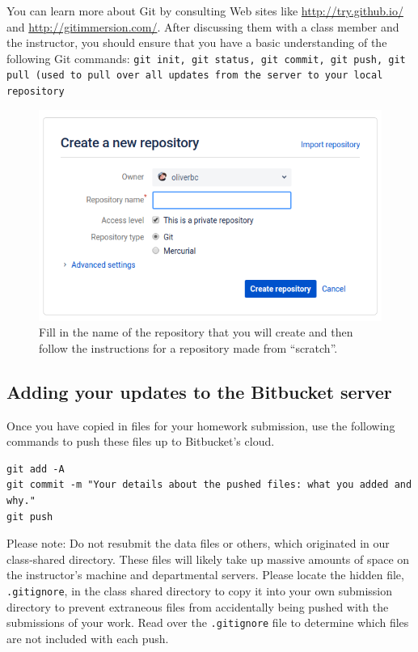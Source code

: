 \noindent You can learn more about Git by consulting Web sites like \url{http://try.github.io/} and \url{http://gitimmersion.com/}. After discussing them with a class member and the instructor, you should ensure that you have a basic understanding of the following Git commands:
{\tt git init, git status, git commit, git push, git pull (used to pull over all updates from the server to your local repository} 

\begin{figure}[!ht]
\begin{center}
\includegraphics[scale=.5]{graphics/create.png} 
\end{center}
\caption{Fill in the name of the repository that you will create and then follow the instructions for a repository made from ``scratch''.}
\label{fig:create}
\end{figure}

\subsection*{Adding your updates to the Bitbucket server}
Once you have copied in files for your homework submission, use the following commands to push these files up to Bitbucket's cloud.

    \vspace*{-.15in}
    \begin{verbatim}
git add -A
git commit -m "Your details about the pushed files: what you added and why."
git push
    \end{verbatim}
    \vspace*{-.33in} 

Please note: Do not resubmit the data files or others, which originated in our class-shared directory. These files will likely take up massive amounts of space on the instructor's machine and departmental servers. Please locate the hidden file, {\tt .gitignore}, in the class shared directory to copy it into your own submission directory to prevent extraneous files from accidentally being pushed with the submissions of your work. Read over the {\tt .gitignore} file to determine which files are not included with each push.


